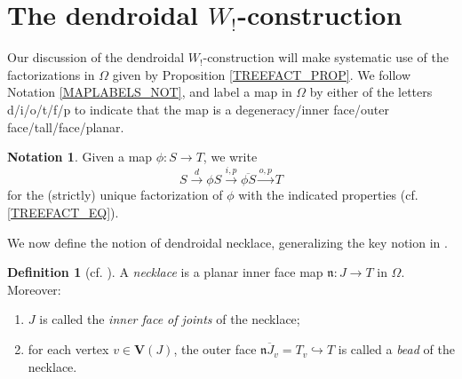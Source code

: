 \documentclass[a4paper,10pt
,draft
]{article}%
\numberwithin{equation}{section}
\numberwithin{figure}{section}
\theoremstyle{definition} %
\newtheorem{definition}[equation]{Definition}%
\newtheorem{notation}[equation]{Notation}%
\newcommand{\1}{\ensuremath{\mathbbm 1}}%
\begin{document}
\section{The dendroidal $W_!$-construction}
\label{WCONS AP}


Our discussion of the dendroidal $W_!$-construction
will make systematic
use of the factorizations in $\Omega$ given by 
Proposition \ref{TREEFACT_PROP}.
We follow Notation \ref{MAPLABELS_NOT},
and label 
a map in $\Omega$
by either of the letters d/i/o/t/f/p
to indicate that the map is
a degeneracy/inner face/outer face/tall/face/planar.

\begin{notation}
        Given a map $\phi\colon S \to T$,
        we write
        \[
                S \xrightarrow{d}
                \phi S \xrightarrow{i,p}
                \overline{\phi S} \xrightarrow{o,p}
                T
        \]
        for the (strictly) unique 
        factorization of $\phi$ with the indicated properties
        (cf. \ref{TREEFACT_EQ}).
\end{notation}


We now define the notion of dendroidal necklace,
generalizing the key notion in \cite{DS11}.
 

\begin{definition}[{cf. \cite[\S 3]{DS11}}]
        \label{NECKLACE_DEF}
	A \emph{necklace} is 
	a planar inner face map
	$\mathfrak{n} \colon J \to T$
	in $\Omega$.
	Moreover:
	\begin{enumerate}[label = (\roman*)]
		\item 
		$J$ is called the \emph{inner face of joints} of the necklace;
		\item for each vertex $v \in \boldsymbol{V}(J)$,
		the outer face
		$\overline{\mathfrak{n} J_v} = T_v \hookrightarrow T$
		is called a \emph{bead} of the necklace.
	\end{enumerate}
\end{definition}
\end{document}
